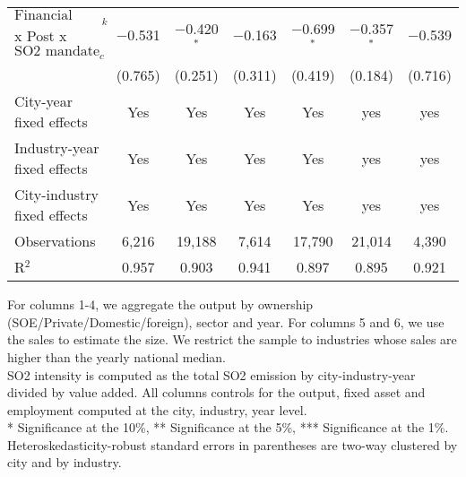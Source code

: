\documentclass[
  convert={
    density=800 -alpha deactivate,
    size=1080x800,
    outext=.png
  },
]{standalone}
\begin{document}
\begin{adjustbox}{varwidth=\maxdimen,max width=\linewidth}
\begin{threeparttable}
\begin{tabular}{l*{6}{c}}
    $\text{Financial dep.}_k$ x Post x $\text{SO2 mandate}_c$ & $-$0.531& $-$0.420$^{*}$ & $-$0.163 & $-$0.699$^{*}$ & $-$0.357$^{*}$ & $-$0.539 \\ 
  & (0.765) & (0.251) & (0.311) & (0.419) & (0.184) & (0.716) \\
    \midrule 
    
    City-year fixed effects & Yes & Yes & Yes & Yes & yes & yes \\ 
    Industry-year fixed effects & Yes & Yes & Yes & Yes & yes & yes \\ 
    City-industry fixed effects & Yes & Yes & Yes & Yes & yes & yes \\ 
    Observations & 6,216 & 19,188 & 7,614 & 17,790 & 21,014 & 4,390 \\ 
    R$^{2}$ & 0.957 &0.903  & 0.941 & 0.897 & 0.895 & 0.921 \\ 
    
    \bottomrule
  \end{tabular}
  \begin{tablenotes}
      \small
      \item For columns 1-4, we aggregate the output by ownership (SOE/Private/Domestic/foreign), sector and year. For columns 5 and 6, we use the sales to estimate the size. We restrict the sample to industries whose sales are higher than the yearly national median. \\
      SO2 intensity is computed as the total SO2 emission by city-industry-year divided by value added. All columns controls for the output, fixed asset and employment computed at the city, industry, year level. \\
      * Significance at the 10\%, ** Significance at the 5\%, *** Significance at the 1\%. Heteroskedasticity-robust standard errors in parentheses are two-way clustered by city and by industry.
    \end{tablenotes}
\end{threeparttable} 
\label{tab:addlabel}%
\end{adjustbox}
\end{document}
